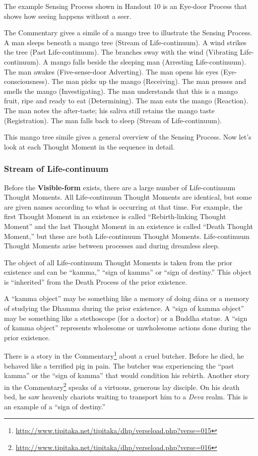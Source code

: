 The example Sensing Process shown in Handout 10 is an Eye-door Process that shows how seeing happens without a seer.

The Commentary gives a simile of a mango tree to illustrate the Sensing Process. A man sleeps beneath a mango tree (Stream of Life-continuum). A wind strikes the tree (Past Life-continuum). The branches sway with the wind (Vibrating Life-continuum). A mango falls beside the sleeping man (Arresting Life-continuum). The man awakes (Five-sense-door Adverting). The man opens his eyes (Eye-consciousness). The man picks up the mango (Receiving). The man presses and smells the mango (Investigating). The man understands that this is a mango fruit, ripe and ready to eat (Determining). The man eats the mango (Reaction). The man notes the after-taste; his saliva still retains the mango taste (Registration). The man falls back to sleep (Stream of Life-continuum).

This mango tree simile gives a general overview of the Sensing Process. Now let’s look at each Thought Moment in the sequence in detail.

\subsubsection*{Stream of Life-continuum}

Before the \textbf{Visible-form} exists, there are a large number of Life-continuum Thought Moments. All Life-continuum Thought Moments are identical, but some are given names according to what is occurring at that time. For example, the first Thought Moment in an existence is called “Rebirth-linking Thought Moment” and the last Thought Moment in an existence is called “Death Thought Moment,” but these are both Life-continuum Thought Moments. Life-continuum Thought Moments arise between processes and during dreamless sleep.

The object of all Life-continuum Thought Moments is taken from the prior existence and can be “kamma,” “sign of kamma” or “sign of destiny.” This object is “inherited” from the Death Process of the prior existence. 

A “kamma object” may be something like a memory of doing dāna or a memory of studying the Dhamma during the prior existence. A “sign of kamma object” may be something like a stethoscope (for a doctor) or a Buddha statue. A “sign of kamma object” represents wholesome or unwholesome actions done during the prior existence. 

There is a story in the Commentary\footnote{\url{http://www.tipitaka.net/tipitaka/dhp/verseload.php?verse=015}} about a cruel butcher. Before he died, he behaved like a terrified pig in pain. The butcher was experiencing the “past kamma” or the “sign of kamma” that would condition his rebirth. Another story in the Commentary\footnote{\url{http://www.tipitaka.net/tipitaka/dhp/verseload.php?verse=016}} speaks of a virtuous, generous lay disciple. On his death bed, he saw heavenly chariots waiting to transport him to a \textit{Deva} realm. This is an example of a “sign of destiny.”

